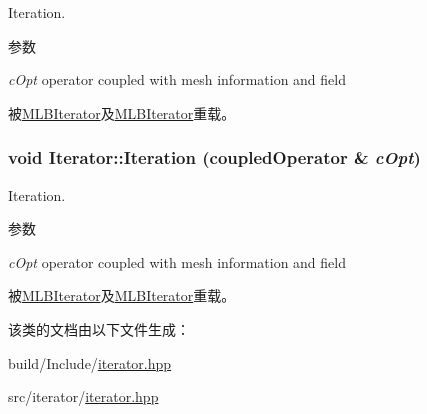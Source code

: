 Iteration. 
\begin{DoxyParams}{参数}
\item[{\em cOpt}]operator coupled with mesh information and field \end{DoxyParams}


被\hyperlink{classMLBIterator_a05e27d9c7ccc97d8e340a9f7ecba14ff}{MLBIterator}及\hyperlink{classMLBIterator_a05e27d9c7ccc97d8e340a9f7ecba14ff}{MLBIterator}重载。\hypertarget{classIterator_a6f5264776582089c8507dc3fc03a6113}{
\subsubsection[{Iteration}]{\setlength{\rightskip}{0pt plus 5cm}void Iterator::Iteration (coupledOperator \& {\em cOpt})}}
\label{classIterator_a6f5264776582089c8507dc3fc03a6113}


Iteration. 
\begin{DoxyParams}{参数}
\item[{\em cOpt}]operator coupled with mesh information and field \end{DoxyParams}


被\hyperlink{classMLBIterator_a05e27d9c7ccc97d8e340a9f7ecba14ff}{MLBIterator}及\hyperlink{classMLBIterator_a05e27d9c7ccc97d8e340a9f7ecba14ff}{MLBIterator}重载。

该类的文档由以下文件生成：\begin{DoxyCompactItemize}
\item 
build/Include/\hyperlink{build_2Include_2iterator_8hpp}{iterator.hpp}\item 
src/iterator/\hyperlink{src_2iterator_2iterator_8hpp}{iterator.hpp}\end{DoxyCompactItemize}
